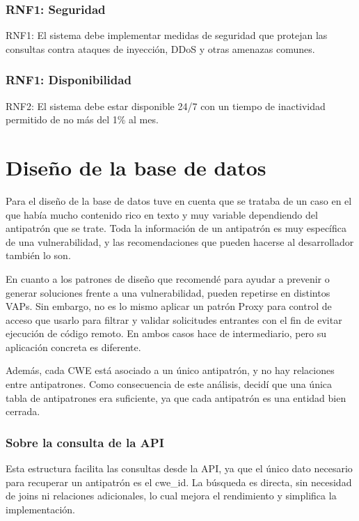 \subsubsection{RNF1: Seguridad}

RNF1: El sistema debe implementar medidas de seguridad que protejan las consultas contra ataques de inyección, DDoS y otras amenazas comunes.

\subsubsection{RNF1: Disponibilidad}

RNF2: El sistema debe estar disponible 24/7 con un tiempo de inactividad permitido de no más del 1\% al mes.


\section{Diseño de la base de datos}

Para el diseño de la base de datos tuve en cuenta que se trataba de un caso en el que había mucho contenido rico en texto y muy variable dependiendo del antipatrón que se trate. Toda la información de un antipatrón es muy específica de una vulnerabilidad, y las recomendaciones que pueden hacerse al desarrollador también lo son.

En cuanto a los patrones de diseño que recomendé para ayudar a prevenir o generar soluciones frente a una vulnerabilidad, pueden repetirse en distintos VAPs. Sin embargo, no es lo mismo aplicar un patrón Proxy para control de acceso que usarlo para filtrar y validar solicitudes entrantes con el fin de evitar ejecución de código remoto. En ambos casos hace de intermediario, pero su aplicación concreta es diferente.

Además, cada CWE está asociado a un único antipatrón, y no hay relaciones entre antipatrones. Como consecuencia de este análisis, decidí que una única tabla de antipatrones era suficiente, ya que cada antipatrón es una entidad bien cerrada.

\subsubsection{Sobre la consulta de la API}

Esta estructura facilita las consultas desde la API, ya que el único dato necesario para recuperar un antipatrón es el cwe\_id. La búsqueda es directa, sin necesidad de joins ni relaciones adicionales, lo cual mejora el rendimiento y simplifica la implementación.


